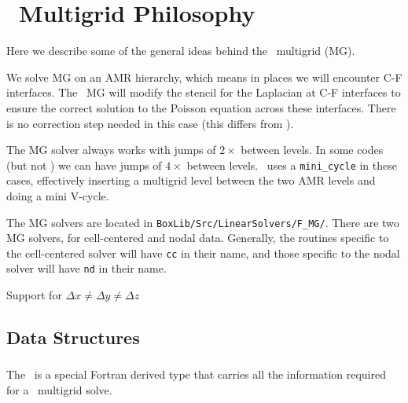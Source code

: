 \label{ch:mg}


\section{\boxlib\ Multigrid Philosophy}

Here we describe some of the general ideas behind the \boxlib\
multigrid (MG).

We solve MG on an AMR hierarchy, which means in places we will encounter
C-F interfaces.  The \boxlib\ MG will modify the stencil for the Laplacian
at C-F interfaces to ensure the correct solution to the Poisson equation
across these interfaces.  There is no correction step needed in this
case (this differs from \cite{ricker:2008}).

The MG solver always works with jumps of $2\times$ between levels.  In 
some codes (but not \maestro) we can have jumps of $4\times$ between
levels.  \boxlib\ uses a {\tt mini\_cycle} in these cases, effectively
inserting a multigrid level between the two AMR levels and doing a mini
V-cycle.

The MG solvers are located in {\tt BoxLib/Src/LinearSolvers/F\_MG/}.
There are two MG solvers, for cell-centered and nodal data.
Generally, the routines specific to the cell-centered solver will have
{\tt cc} in their name, and those specific to the nodal solver will have
{\tt nd} in their name.

Support for $\Delta x \ne \Delta y \ne \Delta z$




\subsection{Data Structures}

\subsubsection{\mgtower}

The \mgtower\ is a special Fortran derived type that carries all the
information required for a \boxlib\ multigrid solve.

